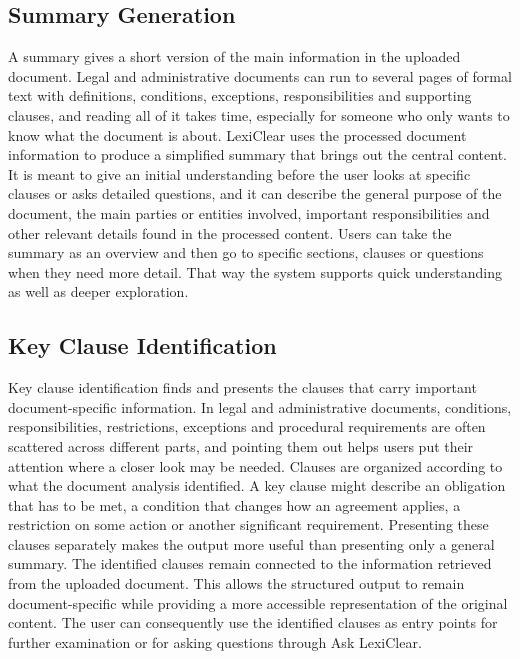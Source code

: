 \documentclass[12pt,a4paper,oneside]{report}
\begin{document}
\subsection{Summary Generation}

A summary gives a short version of the main information in the uploaded document. Legal and administrative documents can run to several pages of formal text with definitions, conditions, exceptions, responsibilities and supporting clauses, and reading all of it takes time, especially for someone who only wants to know what the document is about. LexiClear uses the processed document information to produce a simplified summary that brings out the central content. It is meant to give an initial understanding before the user looks at specific clauses or asks detailed questions, and it can describe the general purpose of the document, the main parties or entities involved, important responsibilities and other relevant details found in the processed content. Users can take the summary as an overview and then go to specific sections, clauses or questions when they need more detail. That way the system supports quick understanding as well as deeper exploration.

\subsection{Key Clause Identification}

Key clause identification finds and presents the clauses that carry important document-specific information. In legal and administrative documents, conditions, responsibilities, restrictions, exceptions and procedural requirements are often scattered across different parts, and pointing them out helps users put their attention where a closer look may be needed. Clauses are organized according to what the document analysis identified. A key clause might describe an obligation that has to be met, a condition that changes how an agreement applies, a restriction on some action or another significant requirement. Presenting these clauses separately makes the output more useful than presenting only a general summary. The identified clauses remain connected to the information retrieved from the uploaded document. This allows the structured output to remain document-specific while providing a more accessible representation of the original content. The user can consequently use the identified clauses as entry points for further examination or for asking questions through Ask LexiClear.
\end{document}
